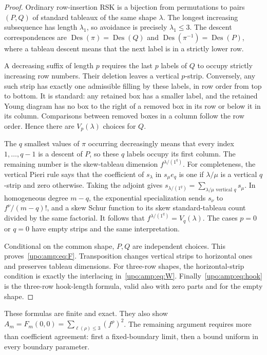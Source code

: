 \documentclass[11pt,letterpaper]{article}
\theoremstyle{remark}\newtheorem{remark}[theorem]{Remark}
\numberwithin{equation}{section}
\newcommand{\Des}{\operatorname{Des}}
\begin{document}
\begin{proof}
Ordinary row-insertion RSK is a bijection from permutations to pairs
$(P,Q)$ of standard tableaux of the same shape $\lambda$. The longest
increasing subsequence has length $\lambda_1$, so avoidance is precisely
$\lambda_1\le3$. The descent correspondences are
$\Des(\pi)=\Des(Q)$ and $\Des(\pi^{-1})=\Des(P)$, where a tableau descent
means that the next label is in a strictly lower row.

A decreasing suffix of length $p$ requires the last $p$ labels of $Q$ to
occupy strictly increasing row numbers. Their deletion leaves a vertical
$p$-strip. Conversely, any such strip has exactly one admissible filling
by these labels, in row order from top to bottom. It is standard: any
retained box has a smaller label, and the retained Young diagram has no
box to the right of a removed box in its row or below it in its column.
Comparisons between removed boxes in a column follow the row order.
Hence there are $V_p(\lambda)$ choices
for $Q$.

The $q$ smallest values of $\pi$ occurring decreasingly means that
every index $1,\ldots,q-1$ is a descent of $P$, so these $q$ labels occupy
its first column. The remaining number is the skew-tableau dimension
$f^{\lambda/(1^q)}$. For completeness, the vertical Pieri rule says that
the coefficient of $s_\lambda$ in $s_\mu e_q$ is one if
$\lambda/\mu$ is a vertical $q$-strip and zero otherwise. Taking the
adjoint gives
$s_{\lambda/(1^q)}=\sum_{\lambda/\mu\text{ vertical }q}s_\mu$.
In homogeneous degree $m-q$, the exponential specialization sends
$s_\nu$ to $f^\nu/(m-q)!$, and a skew Schur function to its skew
standard-tableau count divided by the same factorial. It follows that
$f^{\lambda/(1^q)}=V_q(\lambda)$. The cases $p=0$ or $q=0$ have empty
strips and the same interpretation.

Conditional on the common shape, $P,Q$ are independent choices. This
proves~\eqref{upo:amp:eq:F}. Transposition changes vertical strips to horizontal
ones and preserves tableau dimensions. For three-row shapes, the
horizontal-strip condition is exactly the interlacing in~\eqref{upo:amp:eq:W}.
Finally~\eqref{upo:amp:eq:hook} is the three-row hook-length formula, valid also
with zero parts and for the empty shape.
\end{proof}

These formulas are finite and exact. They also show
$A_m=F_m(0,0)=\sum_{\ell(\rho)\le3}(f^\rho)^2$.
The remaining argument requires more than coefficient agreement: first a
fixed-boundary limit, then a bound uniform in every boundary parameter.
\end{document}
